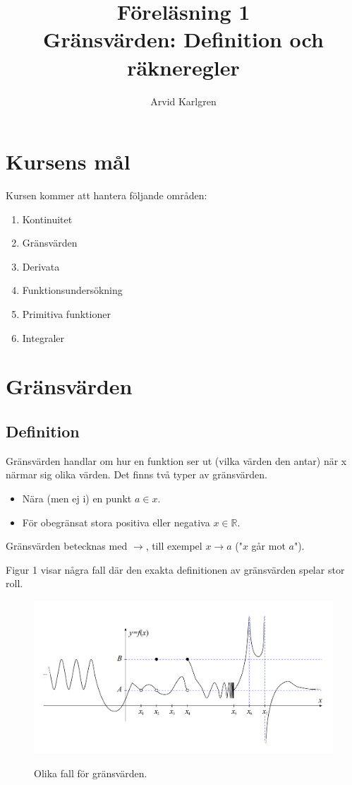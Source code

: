\documentclass[swedish]{article}
\author{Arvid Karlgren}
\title{Föreläsning 1\\
       \LARGE Gränsvärden: Definition och räkneregler}
\begin{document}
\maketitle


\pagebreak

\section{Kursens mål}

Kursen kommer att hantera följande områden:

\begin{enumerate}
    \item Kontinuitet
    \item Gränsvärden
    \item Derivata
    \item Funktionsundersökning
    \item Primitiva funktioner
    \item Integraler
\end{enumerate}

\pagebreak

\section{Gränsvärden}

\subsection{Definition}

Gränsvärden handlar om hur en funktion ser ut (vilka värden den antar) när x närmar sig olika värden. Det finns två typer av gränsvärden.

\begin{itemize}
    \item{Nära (men ej i) en punkt $a\in x$.}
    \item{För obegränsat stora positiva eller negativa $x\in \mathbb{R}$.}
\end{itemize}

Gränsvärden betecknas med $\to$, till exempel $x \to a$ ("$x$ går mot $a$").

Figur 1 visar några fall där den exakta definitionen av gränsvärden spelar stor roll. 

\begin{figure}[h!]
    \includegraphics[width=\linewidth]{figur1.png}
    \label{fig:figur1}
    \caption{Olika fall för gränsvärden.}
\end{figure}
\end{document}
